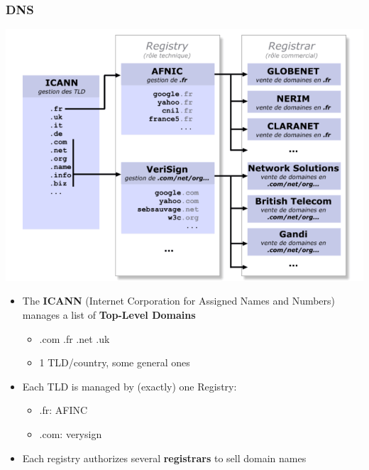 \documentclass[
hyperref={pdfpagelabels=false}
,xcolor=table
]
{beamer}
\begin{document}
\begin{frame}
  \frametitle{DNS}

  \begin{center}
    \includegraphics[width=\textwidth,page=5]{fig/dns.png}
  \end{center}
 
  \begin{itemize}
  \item The \textbf{ICANN} (Internet Corporation for Assigned Names and Numbers) manages a list of \textbf{Top-Level Domains}
    \begin{itemize}
    \item .com .fr .net .uk
    \item 1 TLD/country, some general ones
    \end{itemize}
  \item Each TLD is managed by (exactly) one Registry:
    \begin{itemize}
    \item .fr: AFINC
    \item .com: verysign
    \end{itemize}
  \item Each registry authorizes several \textbf{registrars} to sell domain names
  \end{itemize}
\end{frame}
\end{document}
